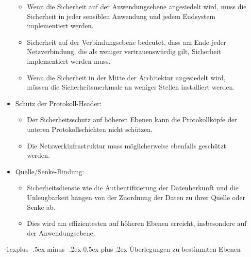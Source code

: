 \documentclass[a4paper]{article}
\makeatletter
\renewcommand{\subsection}{\@startsection{subsection}{2}{0mm}%
 {-1explus -.5ex minus -.2ex}%
 {0.5ex plus .2ex}%
 {\normalfont\normalsize\bfseries}}
\makeatother
\begin{document}
\begin{multicols}{3}
\begin{itemize}
              \begin{itemize}
                  \item
                        Wenn die Sicherheit auf der Anwendungsebene angesiedelt wird, muss
                        die Sicherheit in jeder sensiblen Anwendung und jedem Endsystem
                        implementiert werden.
                  \item
                        Sicherheit auf der Verbindungsebene bedeutet, dass am Ende jeder
                        Netzverbindung, die als weniger vertrauenswürdig gilt, Sicherheit
                        implementiert werden muss.
                  \item
                        Wenn die Sicherheit in der Mitte der Architektur angesiedelt wird,
                        müssen die Sicherheitsmerkmale an weniger Stellen installiert
                        werden.
              \end{itemize}
        \item
              Schutz der Protokoll-Header:

              \begin{itemize}
                  \item
                        Der Sicherheitsschutz auf höheren Ebenen kann die Protokollköpfe der
                        unteren Protokollschichten nicht schützen.
                  \item
                        Die Netzwerkinfrastruktur muss möglicherweise ebenfalls geschützt
                        werden.
              \end{itemize}
        \item
              Quelle/Senke-Bindung:

              \begin{itemize}
                  \item
                        Sicherheitsdienste wie die Authentifizierung der Datenherkunft und
                        die Unleugbarkeit hängen von der Zuordnung der Daten zu ihrer Quelle
                        oder Senke ab.
                  \item
                        Dies wird am effizientesten auf höheren Ebenen erreicht,
                        insbesondere auf der Anwendungsebene.
              \end{itemize}
    \end{itemize}


    \subsection{Überlegungen zu bestimmten
        Ebenen}


\end{multicols}
\end{document}
